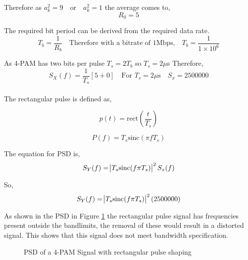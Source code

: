Therefore as $a_k^2=9 \quad \textrm{or} \quad a_k^2=1 $ the average comes to,
\begin{equation}
    \label{eqn:r0-value}
    R_0 = 5
\end{equation}

The required bit period can be derived from the required data rate.
\begin{equation}
    \label{eqn:ts}
    T_b = \frac{1}{R_b} \quad \textrm{Therefore with a bitrate of 1Mbps,} \quad T_b = \frac{1}{1 \times 10^6}
\end{equation}

As 4-PAM has two bits per pulse $T_s = 2 T_b$ so $T_s = 2 \mu$s Therefore,
\begin{equation}
    \label{eqn:sx-real}
    S_X(f) = \frac{1}{T_s} [5 + 0] \quad \textrm{For $T_s = 2\mu$s} \quad S_x=2500000
\end{equation}
\\
The rectangular pulse is defined as,

\begin{equation}
    \label{eqn:pt}
    p(t) = \textrm{rect}(\frac{t}{T_s})
\end{equation}

\begin{equation}
    \label{eqn:pf}
    P(f) = T_s \textrm{sinc}(\pi f T_s)
\end{equation}

The equation for PSD is,
\begin{equation}
    \label{eqn:PSD-4-PAM-rect}
    S_Y(f) = \abs{T_s \textrm{sinc}(f \pi T_s)}^2 S_x(f)
\end{equation}

So,
\begin{equation}
    \label{eqn:sy-value}
    S_Y(f) = \abs{T_s \textrm{sinc}(f \pi T_s)}^2 (2500000)
\end{equation}
    
As shown in the PSD in Figure \ref{fig:psd-rect} the rectangular pulse signal has frequencies present outside
the bandlimits, the removal of these would result in a distorted signal. This shows that this signal does not meet
bandwidth specification.

\begin{figure}[h]
    \begin{center}
        
        \label{fig:psd-rect}
        \caption{PSD of a 4-PAM Signal with rectangular pulse shaping}
    \end{center}
\end{figure}

